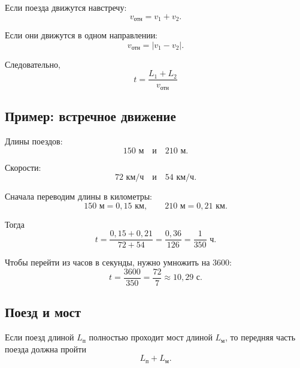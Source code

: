 \documentclass[a4paper,12pt]{article}
\begin{document}
Если поезда движутся навстречу:
\[
v_{\text{отн}}=v_1+v_2.
\]

Если они движутся в одном направлении:
\[
v_{\text{отн}}=|v_1-v_2|.
\]

Следовательно,
\[
\boxed{
t=\frac{L_1+L_2}{v_{\text{отн}}}
}
\]

\begin{center}
\end{center}

\subsection*{Пример: встречное движение}

Длины поездов:
\[
150\text{ м}
\quad\text{и}\quad
210\text{ м}.
\]

Скорости:
\[
72\text{ км/ч}
\quad\text{и}\quad
54\text{ км/ч}.
\]

Сначала переводим длины в километры:
\[
150\text{ м}=0{,}15\text{ км},
\qquad
210\text{ м}=0{,}21\text{ км}.
\]

Тогда
\[
t=
\frac{0{,}15+0{,}21}{72+54}
=
\frac{0{,}36}{126}
=
\frac1{350}\text{ ч}.
\]

Чтобы перейти из часов в секунды,
нужно умножить на \(3600\):
\[
t=
\frac{3600}{350}
=
\frac{72}{7}
\approx 10{,}29\text{ с}.
\]

\subsection*{Поезд и мост}

Если поезд длиной \(L_{\text{п}}\) полностью проходит мост длиной
\(L_{\text{м}}\), то передняя часть поезда должна пройти
\[
L_{\text{п}}+L_{\text{м}}.
\]
\end{document}
